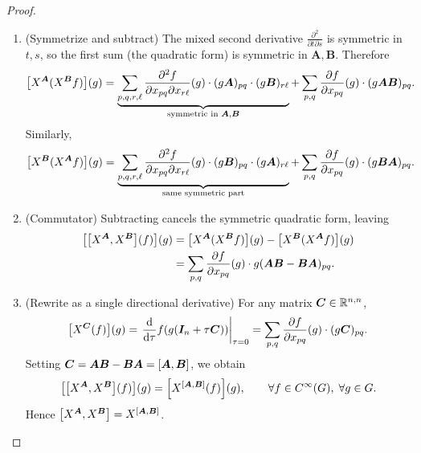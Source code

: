 \documentclass[11pt,reqno]{amsart}
\begin{document}
\begin{proof}
\begin{enumerate}
  \item (Symmetrize and subtract)
  The mixed second derivative $\frac{\partial^2}{\partial t\partial s}$ is symmetric in $t,s$,
  so the first sum (the quadratic form) is symmetric in $\bm A,\bm B$.
  Therefore
  \[
    \begin{aligned}
    \FUNC{X^{\bm A}(X^{\bm B}f)}{g}
    &=
    \underbrace{\sum_{p,q,r,\ell}
    \frac{\partial^2 f}{\partial x_{pq}\partial x_{r\ell}}(g) \cdot
    (g\bm A)_{pq} \cdot (g\bm B)_{r\ell}}_{\text{symmetric in }\bm A,\bm B}
    +\sum_{p,q}
    \frac{\partial f}{\partial x_{pq}}(g) \cdot
    (g\bm A\bm B)_{pq}.
    \end{aligned}
  \]
  Similarly,
  \[
    \FUNC{X^{\bm B}(X^{\bm A}f)}{g}
    =
    \underbrace{\sum_{p,q,r,\ell}
    \frac{\partial^2 f}{\partial x_{pq}\partial x_{r\ell}}(g) \cdot
    (g\bm B)_{pq} \cdot (g\bm A)_{r\ell}}_{\text{same symmetric part}}
    +\sum_{p,q}
    \frac{\partial f}{\partial x_{pq}}(g) \cdot
    (g\bm B\bm A)_{pq}.
  \]

  \item (Commutator)
  Subtracting cancels the symmetric quadratic form, leaving
  \[
    \begin{aligned}
    \FUNC{\SqBr{X^{\bm A}, X^{\bm B}}(f)}{g}
    &=\FUNC{X^{\bm A}(X^{\bm B}f)}{g}
      -\FUNC{X^{\bm B}(X^{\bm A}f)}{g} \\
    &=\sum_{p,q}
    \frac{\partial f}{\partial x_{pq}}(g)
    \cdot g(\bm A\bm B-\bm B\bm A)_{pq}.
    \end{aligned}
  \]

  \item (Rewrite as a single directional derivative)
  For any matrix $\bm C\in\mathbb{R}^{n,n}$,
  \[
    \FUNC{X^{\bm C}(f)}{g}
    =\eval{\frac{\dd}{\dd \tau}
      f\Br{g\Br{\bm I_n+\tau\bm C}}}_{\tau=0}
    =\sum_{p,q}
    \frac{\partial f}{\partial x_{pq}}(g)
    \cdot(g\bm C)_{pq}.
  \]
  Setting $\bm C=\bm A\bm B-\bm B\bm A=\SqBr{\bm A,\bm B}$, we obtain
  \[
    \FUNC{\SqBr{X^{\bm A}, X^{\bm B}}(f)}{g}
    =\FUNC{X^{\SqBr{\bm A,\bm B}}(f)}{g},
    \qquad\forall f\in C^\infty(G),\;\forall g\in G.
  \]
  Hence $\SqBr{X^{\bm A}, X^{\bm B}} = X^{\SqBr{\bm A,\bm B}}$.
  \end{enumerate}
\end{proof}
\end{document}
